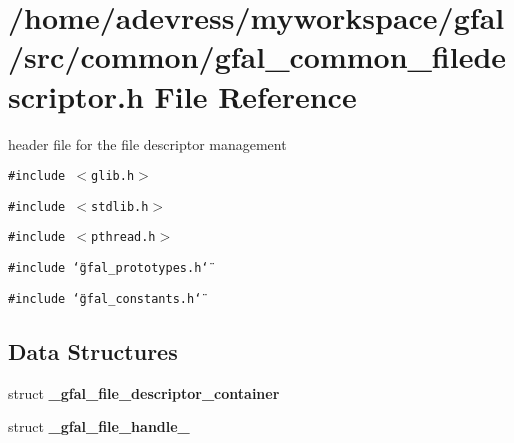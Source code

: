\section{/home/adevress/myworkspace/gfal/src/common/gfal\_\-common\_\-filedescriptor.h File Reference}
\label{gfal__common__filedescriptor_8h}
header file for the file descriptor management 

{\tt \#include $<$glib.h$>$}\par
{\tt \#include $<$stdlib.h$>$}\par
{\tt \#include $<$pthread.h$>$}\par
{\tt \#include \char`\"{}gfal\_\-prototypes.h\char`\"{}}\par
{\tt \#include \char`\"{}gfal\_\-constants.h\char`\"{}}\par
\subsection*{Data Structures}
\begin{CompactItemize}
\item 
struct \textbf{\_\-gfal\_\-file\_\-descriptor\_\-container}
\item 
struct \textbf{\_\-gfal\_\-file\_\-handle\_\-}
\end{CompactItemize}
